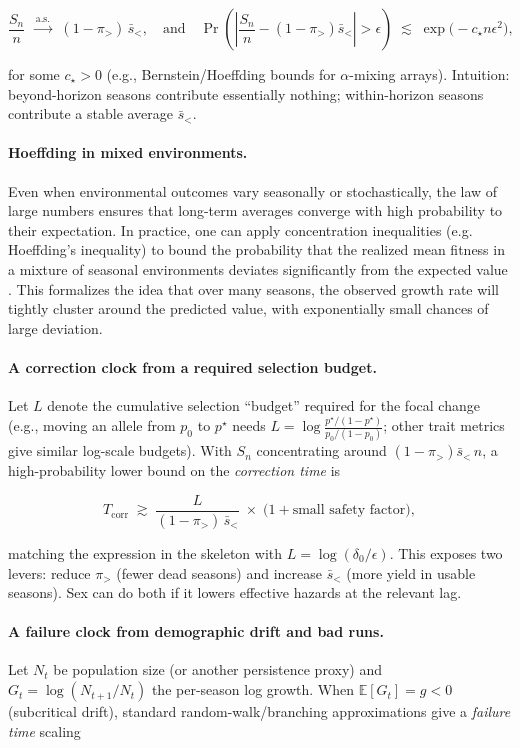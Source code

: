 \documentclass[11pt]{article}
\theoremstyle{upright}
\begin{document}
$$
\frac{S_n}{n}\;\xrightarrow{\;\text{a.s.}\;}\; (1-\pi_{>})\,\bar s_{<},
\quad\text{and}\quad
\Pr\!\left(\left|\frac{S_n}{n}-(1-\pi_{>})\bar s_{<}\right|>\epsilon\right)\;\lesssim\;\exp\!\big(-c_\star n\epsilon^2\big),
$$

for some $c_\star>0$ (e.g., Bernstein/Hoeffding bounds for $\alpha$-mixing arrays). Intuition: beyond-horizon seasons contribute essentially nothing; within-horizon seasons contribute a stable average $\bar s_{<}$.

\paragraph{Hoeffding in mixed environments.}
Even when environmental outcomes vary seasonally or stochastically, the law of large numbers ensures that long-term averages converge with high probability to their expectation. In practice, one can apply concentration inequalities (e.g. Hoeffding’s inequality) to bound the probability that the realized mean fitness in a mixture of seasonal environments deviates significantly from the expected value \citep{Hoeffding1963}. This formalizes the idea that over many seasons, the observed growth rate will tightly cluster around the predicted value, with exponentially small chances of large deviation.

\paragraph{A correction clock from a required selection budget.}
Let $L$ denote the cumulative selection “budget” required for the focal change (e.g., moving an allele from $p_0$ to $p^\star$ needs $L=\log\!\frac{p^\star/(1-p^\star)}{p_0/(1-p_0)}$; other trait metrics give similar log-scale budgets). With $S_n$ concentrating around $(1-\pi_{>})\bar s_{<}\,n$, a high-probability lower bound on the \emph{correction time} is

$$
T_{\mathrm{corr}}\;\gtrsim\;\frac{L}{(1-\pi_{>})\,\bar s_{<}}\;\times\;\Big(1+\text{small safety factor}\Big),
$$

matching the expression in the skeleton with $L=\log(\delta_0/\epsilon)$. This exposes two levers: reduce $\pi_{>}$ (fewer dead seasons) and increase $\bar s_{<}$ (more yield in usable seasons). Sex can do both if it lowers effective hazards at the relevant lag.

\paragraph{A failure clock from demographic drift and bad runs.}
Let $N_t$ be population size (or another persistence proxy) and $G_t=\log(N_{t+1}/N_t)$ the per-season log growth. When $\mathbb E[G_t]=g<0$ (subcritical drift), standard random-walk/branching approximations give a \emph{failure time} scaling
\end{document}
